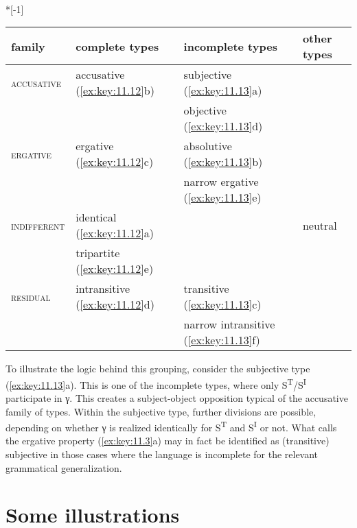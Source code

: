 \documentclass[output=paper]{langsci/langscibook}
\begin{document}
\ea\label{ex:key:11.14} \leavevmode\\*[-1\baselineskip]
    \begin{tabularx}{.922\textwidth}{@{}llll@{}}
    family               & complete types                  & incomplete types          & other types \\
    \midrule
    \textsc{accusative}  & accusative (\ref{ex:key:11.12}b)   & subjective (\ref{ex:key:11.13}a)          & \\
                         &                                 & objective  (\ref{ex:key:11.13}d)          & \\
    \textsc{ergative}    & ergative (\ref{ex:key:11.12}c)  & absolutive (\ref{ex:key:11.13}b)          & \\
                         &                                 & narrow ergative (\ref{ex:key:11.13}e)     & \\
    \textsc{indifferent} & identical (\ref{ex:key:11.12}a)    & & neutral \\
                         & tripartite (\ref{ex:key:11.12}e)                &                           & \\
    \textsc{residual}    & intransitive (\ref{ex:key:11.12}d) & transitive (\ref{ex:key:11.13}c)          & \\
                         &                                 & narrow intransitive (\ref{ex:key:11.13}f) & \\
    \end{tabularx}
\z

To illustrate the logic behind this grouping, consider the subjective type
(\ref{ex:key:11.13}a). This is one of the incomplete types, where only
S\textsuperscript{T}/S\textsuperscript{I} participate in γ. This creates a
subject-object opposition typical of the accusative family of types. Within the
subjective type, further divisions are possible, depending on whether γ is
realized identically for S\textsuperscript{T} and S\textsuperscript{I} or not.
What \citet{Deal2015} calls the ergative property (\ref{ex:key:11.3}a) may in fact be
identified as (transitive) subjective in those cases where the language is
incomplete for the relevant grammatical generalization.

\section{Some illustrations}\label{sec:key:11.4}
\end{document}
